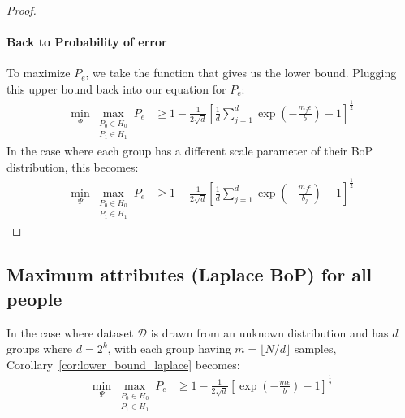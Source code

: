 \begin{proof}
\paragraph{Back to Probability of error} To maximize $P_e$, we take the function that gives us the lower bound. Plugging this upper bound back into our equation for $P_e$:
\begin{align*} 
\min _{\Psi} 
    \max _{\substack{P_0 \in H_0 \\ P_1 \in H_1}}
        P_e 
        &\geq  1 - \frac{1}{2\sqrt{d}}\left[
             \frac{1}{d}
            \sum_{j=1}^d 
            \exp\left(-\frac{m_j\epsilon }{b} \right)
            -1
            \right]^{\frac{1}{2}}
\end{align*}
In the case where each group has a different scale parameter of their BoP distribution, this becomes:
\begin{align*} 
\min _{\Psi} 
    \max _{\substack{P_0 \in H_0 \\ P_1 \in H_1}}
        P_e 
        &\geq  1 - \frac{1}{2\sqrt{d}}\left[
             \frac{1}{d}
            \sum_{j=1}^d 
            \exp\left(-\frac{m_j\epsilon }{b_j} \right)
            -1
            \right]^{\frac{1}{2}}
\end{align*}
\end{proof}

\subsection{Maximum attributes (Laplace BoP) for all people}\label{sec:max_attributes_laplace}
 In the case where dataset $\mathcal{D}$ is drawn from an unknown distribution and has $d$ groups where $d=2^k$, with each group having $m = \lfloor N/d \rfloor$ samples, Corollary~\ref{cor:lower_bound_laplace} becomes:
\begin{align*} 
\min _{\Psi} 
    \max _{\substack{P_0 \in H_0 \\ P_1 \in H_1}}
        P_e 
        &\geq  1 - \frac{1}{2\sqrt{d}}\left[
            \exp\left(-\frac{m\epsilon }{b} \right)
            -1
            \right]^{\frac{1}{2}}
\end{align*}

